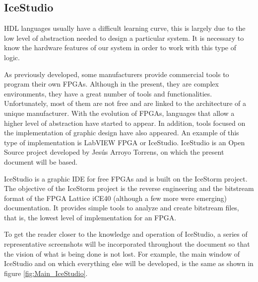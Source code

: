 

\subsection{IceStudio}\label{sec:IceStudio}
HDL languages usually have a difficult learning curve, this is largely due to the low level of abstraction needed to design a particular system. It is necessary to know the hardware features of our system in order to work with this type of logic. \newline

As previously developed, some manufacturers provide commercial tools to program their own FPGAs. Although in the present, they are complex environments, they have a great number of tools and functionalities. Unfortunately, most of them are not free and are linked to the architecture of a unique manufacturer.
\newline
With the evolution of FPGAs, languages that allow a higher level of abstraction have started to appear. In addition, tools focused on the implementation of graphic design have also appeared. An example of this type of implementation is LabVIEW FPGA or IceStudio\cite{IceStudio}. \newline
IceStudio is an Open Source project developed by Jesús Arroyo Torrens, on which the present document will be based. \newline

IceStudio is a graphic IDE for free FPGAs and is built on the IceStorm project. The objective of the IceStorm project is the reverse engineering and the bitstream format of the FPGA Lattice iCE40 (although a few more were emerging) documentation. It provides simple tools to analyze and create bitstream files, that is, the lowest level of implementation for an FPGA.\newline

To get the reader closer to the knowledge and operation of IceStudio, a series of representative screenshots will be incorporated throughout the document so that the vision of what is being done is not lost. For example, the main window of IceStudio and on which everything else will be developed, is the same as shown in figure \ref{fig:Main_IceStudio}. \newline

